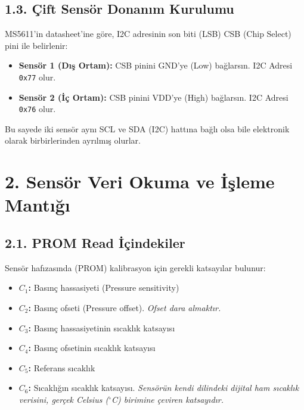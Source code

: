 \documentclass[12pt, a4paper]{article}
\begin{document}
\subsection*{1.3. Çift Sensör Donanım Kurulumu}
MS5611'in datasheet'ine göre, I2C adresinin son biti (LSB) CSB (Chip Select) pini ile belirlenir:
\begin{itemize}
\item \textbf{Sensör 1 (Dış Ortam):} CSB pinini GND'ye (Low) bağlarsın. I2C Adresi \texttt{0x77} olur.
\item \textbf{Sensör 2 (İç Ortam):} CSB pinini VDD'ye (High) bağlarsın. I2C Adresi \texttt{0x76} olur.
\end{itemize}
Bu sayede iki sensör aynı SCL ve SDA (I2C) hattına bağlı olsa bile elektronik olarak birbirlerinden ayrılmış olurlar.

\section*{2. Sensör Veri Okuma ve İşleme Mantığı}

\subsection*{2.1. PROM Read İçindekiler}
Sensör hafızasında (PROM) kalibrasyon için gerekli katsayılar bulunur:
\begin{itemize}
\item \textbf{$C_1$:} Basınç hassasiyeti (Pressure sensitivity)
\item \textbf{$C_2$:} Basınç ofseti (Pressure offset). \textit{Ofset dara almaktır.}
\item \textbf{$C_3$:} Basınç hassasiyetinin sıcaklık katsayısı
\item \textbf{$C_4$:} Basınç ofsetinin sıcaklık katsayısı
\item \textbf{$C_5$:} Referans sıcaklık
\item \textbf{$C_6$:} Sıcaklığın sıcaklık katsayısı. \textit{Sensörün kendi dilindeki dijital ham sıcaklık verisini, gerçek Celsius ($^\circ$C) birimine çeviren katsayıdır.}
\end{itemize}
\end{document}
